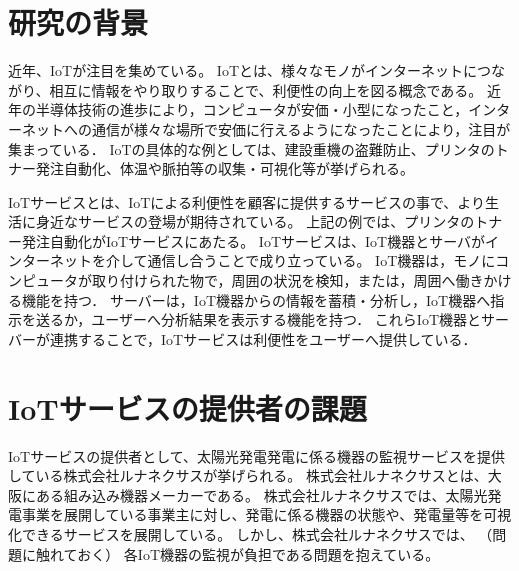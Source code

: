 \begin{comment}
IoTサービスというものがある。
IoTサービスはこんな構造をしている。
だけど、IoTサービスの開発・運用は大変
・開発者が開発するのが大変
・運用者が維持することが大変

なので、監視が必要です。

本論文では、〇〇と△△といった方法で、監視システムを開発することにより、
IoTサービスの開発者と運用者の負担を軽減する事を目指す。
\end{comment}



\section{研究の背景}
近年、IoTが注目を集めている。
IoTとは、様々なモノがインターネットにつながり、相互に情報をやり取りすることで、利便性の向上を図る概念である。
近年の半導体技術の進歩により，コンピュータが安価・小型になったこと，インターネットへの通信が様々な場所で安価に行えるようになったことにより，注目が集まっている．
IoTの具体的な例としては、建設重機の盗難防止、プリンタのトナー発注自動化、体温や脈拍等の収集・可視化等が挙げられる。
\medskip

IoTサービスとは、IoTによる利便性を顧客に提供するサービスの事で、より生活に身近なサービスの登場が期待されている。
上記の例では、プリンタのトナー発注自動化がIoTサービスにあたる。
IoTサービスは、IoT機器とサーバがインターネットを介して通信し合うことで成り立っている。
IoT機器は，モノにコンピュータが取り付けられた物で，周囲の状況を検知，または，周囲へ働きかける機能を持つ．
サーバーは，IoT機器からの情報を蓄積・分析し，IoT機器へ指示を送るか，ユーザーへ分析結果を表示する機能を持つ．
これらIoT機器とサーバーが連携することで，IoTサービスは利便性をユーザーへ提供している．

\section{IoTサービスの提供者の課題}
IoTサービスの提供者として、太陽光発電発電に係る機器の監視サービスを提供している株式会社ルナネクサスが挙げられる。
株式会社ルナネクサスとは、大阪にある組み込み機器メーカーである。
株式会社ルナネクサスでは、太陽光発電事業を展開している事業主に対し、発電に係る機器の状態や、発電量等を可視化できるサービスを展開している。
しかし、株式会社ルナネクサスでは、
（問題に触れておく）
各IoT機器の監視が負担である問題を抱えている。

\begin{comment}
\begin{itemize}
\item IoT機器が接続されるネットワークの構成は様々であり、接続されるネットワークの変更も出来ないことが多い。
\item IoTサービスが提供する機能と、ネットワークや機器の状態の監視は別機能である為、IoTサービスに組み込む事は困難である。
\item IoT機器は安価であるため、大量に使用される。そのため、設定が困難である。
\end{itemize}
\end{comment}

